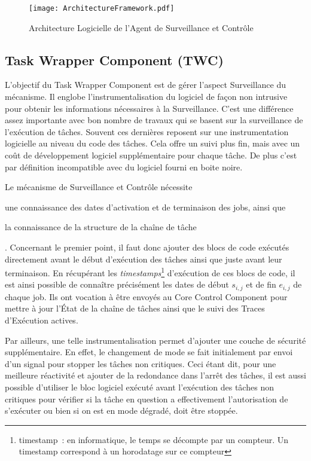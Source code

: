 \documentclass[french, a4paper, 11pt, twoside, pdftex]{StyleThese}
\begin{document}
	
        \begin{figure}[ht]
            \centering
            \texttt{[image: ArchitectureFramework.pdf]}
            \caption{Architecture Logicielle de l'Agent de Surveillance et Contrôle}
            \label{fig:architecture}
        \end{figure}
        
        
        \subsection{Task Wrapper Component (TWC)} 
        
        L'objectif du Task Wrapper Component est de gérer l'aspect Surveillance du mécanisme. Il englobe l'instrumentalisation du logiciel de façon non intrusive pour obtenir les informations nécessaires à la Surveillance. C'est une différence assez importante avec bon nombre de travaux qui se basent sur la surveillance de l'exécution de tâches. Souvent ces dernières reposent sur une instrumentation logicielle au niveau du code des tâches. Cela offre un suivi plus fin, mais avec un coût de développement logiciel supplémentaire pour chaque tâche. De plus c'est par définition incompatible avec du logiciel fourni en boite noire.
        
        Le mécanisme de Surveillance et Contrôle nécessite \begin{enumerate*}[label=\bfseries\alph*)]
        	\item une connaissance des dates d'activation et de terminaison des jobs, ainsi que 
        	\item la connaissance de la structure de la chaîne de tâche
        \end{enumerate*}. Concernant le premier point, il faut donc ajouter des blocs de code exécutés directement avant le début d'exécution des tâches ainsi que juste avant leur terminaison. En récupérant les \textit{timestamps}\footnote{timestamp~: en informatique, le temps se décompte par un compteur. Un timestamp correspond à un horodatage sur ce compteur} d'exécution de ces blocs de code, il est ainsi possible de connaître précisément les dates de début $s_{i,j}$ et de fin $e_{i,j}$ de chaque job. Ils ont vocation à être envoyés au Core Control Component pour mettre à jour l'État de la chaîne de tâches ainsi que le suivi des Traces d'Exécution actives.
        
        Par ailleurs, une telle instrumentalisation permet d'ajouter une couche de sécurité supplémentaire. En effet, le changement de mode se fait initialement par envoi d'un signal pour stopper les tâches non critiques. Ceci étant dit, pour une meilleure réactivité et ajouter de la redondance dans l'arrêt des tâches, il est aussi possible d'utiliser le bloc logiciel exécuté avant l'exécution des tâches non critiques pour vérifier si la tâche en question a effectivement l'autorisation de s'exécuter ou bien si on est en mode dégradé, doit être stoppée. 
        
\end{document}
